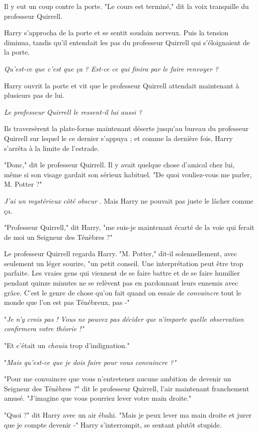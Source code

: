 Il y eut un coup contre la porte. "Le cours est terminé," dit la voix tranquille du professeur Quirrell.

Harry s'approcha de la porte et se sentit soudain nerveux. Puis la tension diminua, tandis qu'il entendait les pas du professeur Quirrell qui s'éloignaient de la porte.

\emph{Qu'est-ce que c'est que ça ? Est-ce ce qui finira par le faire renvoyer ?} 

Harry ouvrit la porte et vit que le professeur Quirrell attendait maintenant à plusieurs pas de lui.

\emph{Le professeur Quirrell le ressent-il lui aussi ?} 

Ils traversèrent la plate-forme maintenant déserte jusqu'au bureau du professeur Quirrell sur lequel le ce dernier s'appuya ; et comme la dernière fois, Harry s'arrêta à la limite de l'estrade.

"Donc," dit le professeur Quirrell. Il y avait quelque chose d'amical chez lui, même si son visage gardait son sérieux habituel. "De quoi vouliez-vous me parler, M. Potter ?"

\emph{J'ai un mystérieux côté obscur} . Mais Harry ne pouvait pas juste le lâcher comme ça.

"Professeur Quirrell," dit Harry, "me suis-je maintenant écarté de la voie qui ferait de moi un Seigneur des Ténèbres ?"

Le professeur Quirrell regarda Harry. "M. Potter," dit-il solennellement, avec seulement un léger sourire, "un petit conseil. Une interprétation peut être trop parfaite. Les vraies gens qui viennent de se faire battre et de se faire humilier pendant quinze minutes ne se relèvent pas en pardonnant leurs ennemis avec grâce. C'est le genre de chose qu'on fait quand on essaie de \emph{convaincre}  tout le monde que l'on est pas Ténébreux, pas -"

"\emph{Je n'y crois pas ! Vous ne pouvez pas décider que n'importe quelle observation confirmera votre théorie !"} 

"Et c'était un \emph{chouia}  trop d'indignation."

"\emph{Mais qu'est-ce que je dois faire pour vous convaincre ?"} 

"Pour me convaincre que vous n'entretenez aucune ambition de devenir un Seigneur des Ténèbres ?" dit le professeur Quirrell, l'air maintenant franchement amusé. "J'imagine que vous pourriez lever votre main droite."

"Quoi ?" dit Harry avec un air ébahi. "Mais je peux lever ma main droite et jurer que je compte devenir -" Harry s'interrompit, se sentant plutôt stupide.

